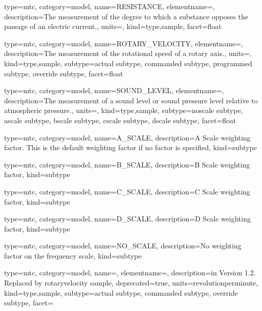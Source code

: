 {
  type=mtc,
  category=model,
  name={RESISTANCE},
  elementname=,
  description={The measurement of the degree to which a substance opposes the passage of an electric current.},
  units=,
  kind={type,sample},
  facet={\gls{float}}
}


{
  type=mtc,
  category=model,
  name={ROTARY\_VELOCITY},
  elementname=,
  description={The measurement of the rotational speed of a rotary axis.},
  units=,
  kind={type,sample},
  subtype={\gls{actual subtype}, \gls{commanded subtype}, \gls{programmed subtype}, \gls{override subtype}},
  facet={\gls{float}}
}



{
  type=mtc,
  category=model,
  name={SOUND\_LEVEL},
  elementname=,
  description={The measurement of a sound level or sound pressure level relative to atmospheric pressure.},
  units=,
  kind={type,sample},
  subtype={\gls{noscale subtype}, \gls{ascale subtype}, \gls{bscale subtype}, \gls{cscale subtype}, \gls{dscale subtype}},
  facet={\gls{float}}
}


{
  type=mtc,
  category=model,
  name={A\_SCALE},
  description={A Scale weighting factor.   This is the default weighting factor if no factor is specified},
  kind={subtype}
}


{
  type=mtc,
  category=model,
  name={B\_SCALE},
  description={B Scale weighting factor},
  kind={subtype}
}


{
  type=mtc,
  category=model,
  name={C\_SCALE},
  description={C Scale weighting factor},
  kind={subtype}
}


{
  type=mtc,
  category=model,
  name={D\_SCALE},
  description={D Scale weighting factor},
  kind={subtype}
}


{
  type=mtc,
  category=model,
  name={NO\_SCALE},
  description={No weighting factor on the frequency scale},
  kind={subtype}
}


{
  type=mtc,
  category=model,
  name={},
  elementname=,
  description={\DEPRECATED in Version 1.2.  Replaced by \gls{rotaryvelocity sample}},
  deprecated={true},
  units={\gls{revolutionperminute}},
  kind={type,sample},
  subtype={\gls{actual subtype}, \gls{commanded subtype}, \gls{override subtype}},
  facet={}
}



